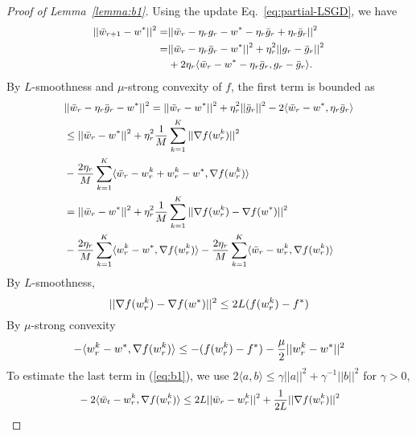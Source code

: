 \begin{proof}[Proof of Lemma~\ref{lemma:b1}]
Using the update Eq.~\ref{eq:partial-LSGD}, we have 
\begin{equation}
\small
\label{eq:b0}
\begin{split}
||\Bar{w}_{r+1}-w^*||^2=&||\Bar{w}_r-\eta_rg_r-w^*-\eta_r\Bar{g}_r+\eta_r\Bar{g}_r||^2\\
    =&||\Bar{w}_r-\eta_r\Bar{g}_r-w^*||^2+\eta_r^2||g_r-\Bar{g}_r||^2\\
    &+2\eta_r\langle\Bar{w}_r-w^*-\eta_r\Bar{g}_r,g_r-\Bar{g}_r\rangle.
\end{split}
\end{equation}
By $L$-smoothness and $\mu$-strong convexity of $f$, the first term is bounded as 
\begin{equation}
\small
\label{eq:b1}
\begin{split}
    &||\Bar{w}_r-\eta_r\Bar{g}_r-w^*||^2=||\Bar{w}_r-w^*||^2+\eta_r^2||\Bar{g}_r||^2-2\langle\Bar{w}_r-w^*,\eta_r\Bar{g}_r\rangle\\
    &\leq ||\Bar{w}_r-w^*||^2+\eta_r^2\frac{1}{M}\sum_{k=1}^K||\nabla f(w_r^k)||^2\\
    &-\frac{2\eta_r}{M}\sum_{k=1}^K\langle\Bar{w}_r-w^k_r+w^k_r-w^*,\nabla f(w_r^k)\rangle\\
    &=||\Bar{w}_r-w^*||^2+\eta_r^2\frac{1}{M}\sum_{k=1}^K||\nabla f(w_r^k)-\nabla f(w^*)||^2\\
    &-\frac{2\eta_r}{M}\sum_{k=1}^K\langle w^k_r-w^*,\nabla f(w_r^k)\rangle-\frac{2\eta_r}{M}\sum_{k=1}^K\langle\Bar{w}_r-w^k_r,\nabla f(w_r^k)\rangle\\
\end{split}
\end{equation}
By $L$-smoothness,
\begin{equation}
\small
    ||\nabla f(w_r^k)-\nabla f(w^*)||^2\leq2L(f(w_r^k)-f^*)
\end{equation}
By $\mu$-strong convexity
\begin{equation}
\small
    -\langle w_r^k-w^*,\nabla f(w_r^k)\rangle\leq-(f(w_r^k)-f^*)-\frac{\mu}{2}||w_r^k-w^*||^2
\end{equation}
To estimate the last term in (\ref{eq:b1}), we use $2\langle a,b\rangle\leq\gamma||a||^2+\gamma^{-1}||b||^2$ for $\gamma>0$,
\begin{equation}
\small
\label{eq:b2}
\begin{split}
    &-2\langle\Bar{w}_t-w_r^k,\nabla f(w_r^k)\rangle\leq2L||\Bar{w}_r-w_r^k||^2+\frac{1}{2L}||\nabla f(w_r^k)||^2\\

\end{split}
\end{equation}
\end{proof}
